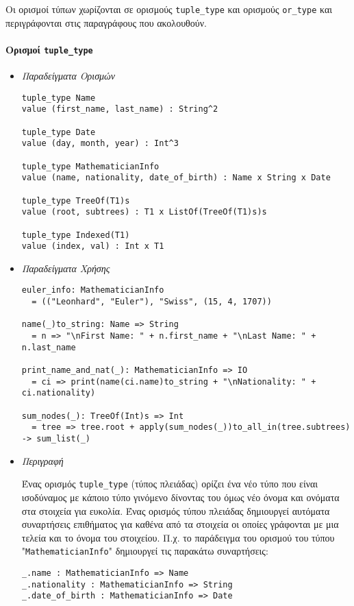 \documentclass[diploma]{softlab-thesis}
\begin{document}
Οι ορισμοί τύπων χωρίζονται σε ορισμούς \verb|tuple_type| και ορισμούς
\verb|or_type| και περιγράφονται στις παραγράφους που ακολουθούν.

\paragraph{Ορισμοί \texttt{tuple_type}}

\begin{itemize}
\item \textit{Παραδείγματα Ορισμών}

\begin{verbatim}
tuple_type Name
value (first_name, last_name) : String^2

tuple_type Date
value (day, month, year) : Int^3

tuple_type MathematicianInfo
value (name, nationality, date_of_birth) : Name x String x Date

tuple_type TreeOf(T1)s
value (root, subtrees) : T1 x ListOf(TreeOf(T1)s)s

tuple_type Indexed(T1)
value (index, val) : Int x T1
\end{verbatim}

\item \textit{Παραδείγματα Χρήσης}

\begin{verbatim}
euler_info: MathematicianInfo
  = (("Leonhard", "Euler"), "Swiss", (15, 4, 1707))

name(_)to_string: Name => String
  = n => "\nFirst Name: " + n.first_name + "\nLast Name: " + n.last_name

print_name_and_nat(_): MathematicianInfo => IO
  = ci => print(name(ci.name)to_string + "\nNationality: " + ci.nationality)

sum_nodes(_): TreeOf(Int)s => Int
  = tree => tree.root + apply(sum_nodes(_))to_all_in(tree.subtrees) -> sum_list(_)
\end{verbatim}

\item \textit{Περιγραφή}

Ένας ορισμός \verb|tuple_type| (τύπος πλειάδας) ορίζει ένα νέο τύπο που είναι
ισοδύναμος με κάποιο τύπο γινόμενο δίνοντας του όμως νέο όνομα και ονόματα στα
στοιχεία για ευκολία. Ένας ορισμός τύπου πλειάδας δημιουργεί αυτόματα
συναρτήσεις επιθήματος για καθένα από τα στοιχεία οι οποίες γράφονται με μια
τελεία και το όνομα του στοιχείου. Π.χ. το παράδειγμα του ορισμού του τύπου
"\verb|MathematicianInfo|" δημιουργεί τις παρακάτω συναρτήσεις:
\begin{verbatim}
_.name : MathematicianInfo => Name
_.nationality : MathematicianInfo => String
_.date_of_birth : MathematicianInfo => Date
\end{verbatim}

\end{itemize}
\end{document}
